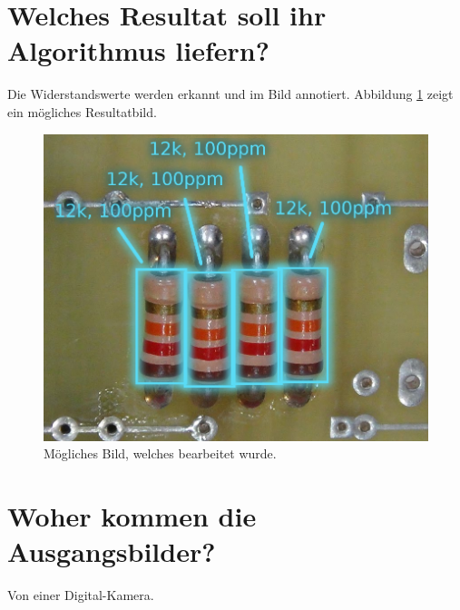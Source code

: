 \documentclass{article}
\begin{document}
\newpage
\section{Welches Resultat soll ihr Algorithmus liefern?}

Die   Widerstandswerte   werden  erkannt  und  im  Bild  annotiert.  Abbildung
\ref{fig:resultat} zeigt ein m\"ogliches Resultatbild.

\begin{figure}[H]
    \centering
    \includegraphics[width=.8\linewidth]{images/resultat.png}
    \caption{M\"ogliches Bild, welches bearbeitet wurde.}
    \label{fig:resultat}
\end{figure}


\section{Woher kommen die Ausgangsbilder?}

Von einer Digital-Kamera.
\end{document}
